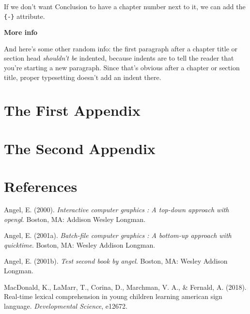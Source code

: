 \documentclass[oneside]{report}
\begin{document}
If we don't want Conclusion to have a chapter number next to it, we can
add the \texttt{\{-\}} attribute.

\textbf{More info}

And here's some other random info: the first paragraph after a chapter
title or section head \emph{shouldn't be} indented, because indents are
to tell the reader that you're starting a new paragraph. Since that's
obvious after a chapter or section title, proper typesetting doesn't add
an indent there.

\appendix

\hypertarget{the-first-appendix}{%
\chapter{The First Appendix}\label{the-first-appendix}}

\hypertarget{the-second-appendix}{%
\chapter{The Second Appendix}\label{the-second-appendix}}

\hypertarget{references}{%
\chapter*{References}\label{references}}


\noindent

\setlength{\parindent}{-0.20in}
\setlength{\leftskip}{0.20in}
\setlength{\parskip}{8pt}

\hypertarget{refs}{}
\leavevmode\hypertarget{ref-angel2000}{}%
Angel, E. (2000). \emph{Interactive computer graphics : A top-down
approach with opengl}. Boston, MA: Addison Wesley Longman.

\leavevmode\hypertarget{ref-angel2001}{}%
Angel, E. (2001a). \emph{Batch-file computer graphics : A bottom-up
approach with quicktime}. Boston, MA: Wesley Addison Longman.

\leavevmode\hypertarget{ref-angel2002a}{}%
Angel, E. (2001b). \emph{Test second book by angel}. Boston, MA: Wesley
Addison Longman.

\leavevmode\hypertarget{ref-macdonald2018real}{}%
MacDonald, K., LaMarr, T., Corina, D., Marchman, V. A., \& Fernald, A.
(2018). Real-time lexical comprehension in young children learning
american sign language. \emph{Developmental Science}, e12672.


\end{document}
